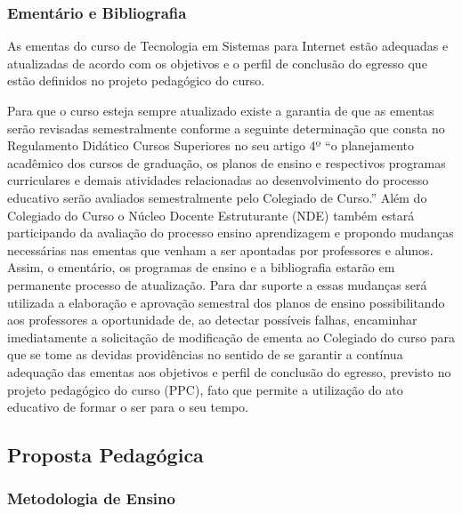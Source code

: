 

\subsubsection{Ementário e Bibliografia}

	As ementas do curso de Tecnologia em Sistemas para Internet estão adequadas e atualizadas de acordo com os objetivos e o perfil de conclusão do egresso que estão definidos no projeto pedagógico do curso. 
			
			Para que o curso esteja sempre atualizado existe a garantia de que as ementas serão revisadas semestralmente conforme a seguinte determinação que consta no Regulamento Didático Cursos Superiores no seu artigo 4º “o planejamento acadêmico dos cursos de graduação, os planos de ensino e respectivos programas curriculares e demais atividades relacionadas ao desenvolvimento do processo educativo serão avaliados semestralmente pelo Colegiado de Curso.” Além do Colegiado do Curso o Núcleo Docente Estruturante (NDE) também estará participando da avaliação do processo ensino aprendizagem e propondo mudanças necessárias nas ementas que venham a ser apontadas por professores e alunos. Assim, o ementário, os programas de ensino e a bibliografia estarão em permanente processo de atualização. Para dar suporte a essas mudanças será utilizada a elaboração e aprovação semestral dos planos de ensino possibilitando aos professores a oportunidade de, ao detectar possíveis falhas, encaminhar imediatamente a solicitação de modificação de ementa ao Colegiado do curso para que se tome as devidas providências no sentido de se garantir a contínua adequação das ementas aos objetivos e perfil de conclusão do egresso, previsto no projeto pedagógico do curso (PPC), fato que permite a utilização do ato educativo de formar o ser para o seu tempo.



\subsection{Proposta Pedag\'ogica}

\subsubsection{Metodologia de Ensino}

